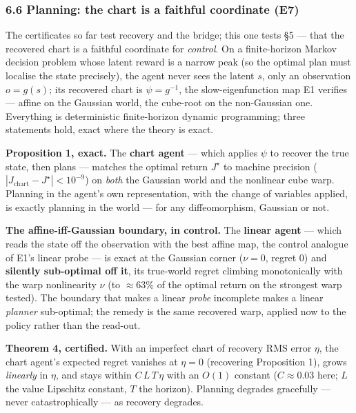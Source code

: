 \documentclass[
  letterpaper,
  11pt]{article}
\theoremstyle{plain}
\theoremstyle{definition}
\theoremstyle{remark}
\begin{document}
\subsubsection{6.6 Planning: the chart is a faithful coordinate (E7)}\label{sec:e7}

The certificates so far test recovery and the bridge; this one tests §5 --- that the recovered chart is a faithful coordinate for \emph{control}. On a finite-horizon Markov decision problem whose latent reward is a narrow peak (so the optimal plan must localise the state precisely), the agent never sees the latent \(s\), only an observation \(o=g(s)\); its recovered chart is \(\psi=g^{-1}\), the slow-eigenfunction map E1 verifies --- affine on the Gaussian world, the cube-root on the non-Gaussian one. Everything is deterministic finite-horizon dynamic programming; three statements hold, exact where the theory is exact.

\textbf{Proposition 1, exact.} The \textbf{chart agent} --- which applies \(\psi\) to recover the true state, then plans --- matches the optimal return \(J^\star\) to machine precision (\(|J_{\text{chart}}-J^\star|<10^{-9}\)) on \emph{both} the Gaussian world and the nonlinear cube warp. Planning in the agent's own representation, with the change of variables applied, is exactly planning in the world --- for any diffeomorphism, Gaussian or not.

\textbf{The affine-iff-Gaussian boundary, in control.} The \textbf{linear agent} --- which reads the state off the observation with the best affine map, the control analogue of E1's linear probe --- is exact at the Gaussian corner (\(\nu=0\), regret \(0\)) and \textbf{silently sub-optimal off it}, its true-world regret climbing monotonically with the warp nonlinearity \(\nu\) (to \(\approx 63\%\) of the optimal return on the strongest warp tested). The boundary that makes a linear \emph{probe} incomplete makes a linear \emph{planner} sub-optimal; the remedy is the same recovered warp, applied now to the policy rather than the read-out.

\textbf{Theorem 4, certified.} With an imperfect chart of recovery RMS error \(\eta\), the chart agent's expected regret vanishes at \(\eta=0\) (recovering Proposition 1), grows \emph{linearly} in \(\eta\), and stays within \(C\,L\,T\,\eta\) with an \(O(1)\) constant (\(C\approx 0.03\) here; \(L\) the value Lipschitz constant, \(T\) the horizon). Planning degrades gracefully --- never catastrophically --- as recovery degrades.
\end{document}
